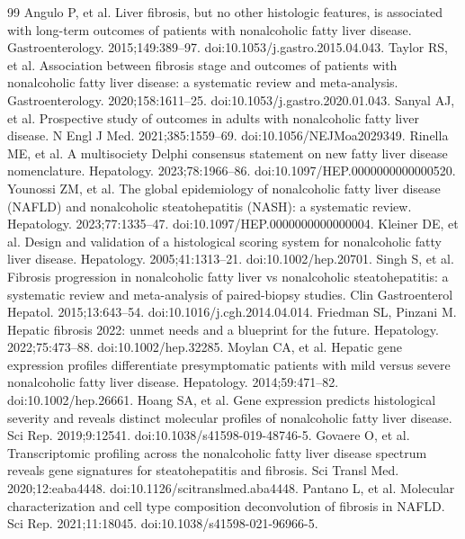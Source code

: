 \documentclass[11pt,a4paper]{article}
\begin{document}
{\small
\renewcommand{\refname}{References}
\begin{thebibliography}{99}\setlength{\itemsep}{1pt}
 Angulo P, et al. Liver fibrosis, but no other histologic features, is associated with long-term outcomes of patients with nonalcoholic fatty liver disease. Gastroenterology. 2015;149:389--97. doi:10.1053/j.gastro.2015.04.043.
 Taylor RS, et al. Association between fibrosis stage and outcomes of patients with nonalcoholic fatty liver disease: a systematic review and meta-analysis. Gastroenterology. 2020;158:1611--25. doi:10.1053/j.gastro.2020.01.043.
 Sanyal AJ, et al. Prospective study of outcomes in adults with nonalcoholic fatty liver disease. N Engl J Med. 2021;385:1559--69. doi:10.1056/NEJMoa2029349.
 Rinella ME, et al. A multisociety Delphi consensus statement on new fatty liver disease nomenclature. Hepatology. 2023;78:1966--86. doi:10.1097/HEP.0000000000000520.
 Younossi ZM, et al. The global epidemiology of nonalcoholic fatty liver disease (NAFLD) and nonalcoholic steatohepatitis (NASH): a systematic review. Hepatology. 2023;77:1335--47. doi:10.1097/HEP.0000000000000004.
 Kleiner DE, et al. Design and validation of a histological scoring system for nonalcoholic fatty liver disease. Hepatology. 2005;41:1313--21. doi:10.1002/hep.20701.
 Singh S, et al. Fibrosis progression in nonalcoholic fatty liver vs nonalcoholic steatohepatitis: a systematic review and meta-analysis of paired-biopsy studies. Clin Gastroenterol Hepatol. 2015;13:643--54. doi:10.1016/j.cgh.2014.04.014.
 Friedman SL, Pinzani M. Hepatic fibrosis 2022: unmet needs and a blueprint for the future. Hepatology. 2022;75:473--88. doi:10.1002/hep.32285.
 Moylan CA, et al. Hepatic gene expression profiles differentiate presymptomatic patients with mild versus severe nonalcoholic fatty liver disease. Hepatology. 2014;59:471--82. doi:10.1002/hep.26661.
 Hoang SA, et al. Gene expression predicts histological severity and reveals distinct molecular profiles of nonalcoholic fatty liver disease. Sci Rep. 2019;9:12541. doi:10.1038/s41598-019-48746-5.
 Govaere O, et al. Transcriptomic profiling across the nonalcoholic fatty liver disease spectrum reveals gene signatures for steatohepatitis and fibrosis. Sci Transl Med. 2020;12:eaba4448. doi:10.1126/scitranslmed.aba4448.
 Pantano L, et al. Molecular characterization and cell type composition deconvolution of fibrosis in NAFLD. Sci Rep. 2021;11:18045. doi:10.1038/s41598-021-96966-5.

\end{thebibliography}}
\end{document}

